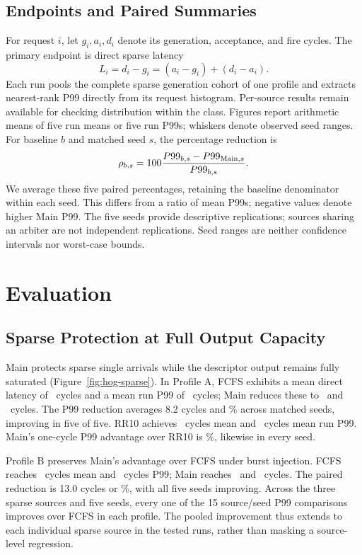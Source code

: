 \subsection{Endpoints and Paired Summaries}
For request $i$, let $g_i,a_i,d_i$ denote its generation, acceptance, and fire cycles.
The primary endpoint is direct sparse latency
\begin{equation}
 L_i=d_i-g_i=(a_i-g_i)+(d_i-a_i).
 \label{eq:latency}
\end{equation}
Each run pools the complete sparse generation cohort of one profile and extracts
nearest-rank P99 directly from its request histogram. Per-source results remain
available for checking distribution within the class. Figures report arithmetic
means of five run means or five run P99s; whiskers denote observed seed ranges.
For baseline $b$ and matched seed $s$, the percentage reduction is
\begin{equation}
 \rho_{b,s}=100\frac{P99_{b,s}-P99_{{\rm Main},s}}{P99_{b,s}}.
 \label{eq:paired}
\end{equation}
We average these five paired percentages, retaining the baseline denominator
within each seed. This differs from a ratio of mean P99s; negative values
denote higher Main P99. The five seeds provide descriptive replications;
sources sharing an arbiter are not independent replications. Seed ranges
are neither confidence intervals nor worst-case bounds.

\section{Evaluation}
\subsection{Sparse Protection at Full Output Capacity}
Main protects sparse single arrivals while the descriptor output remains fully
saturated (Figure~\ref{fig:hog-sparse}). In Profile A, FCFS exhibits a mean direct
latency of \HSMeanAFCFS\ cycles and a mean run P99 of \HSPtailAFCFS\ cycles;
Main reduces these to \HSMeanAMain\ and \HSPtailAMain\ cycles.
The P99 reduction averages 8.2 cycles and \HSReductionAFCFS\% across matched
seeds, improving in five of five. RR10 achieves \HSMeanARR\ cycles mean and
\HSPtailARR\ cycles mean run P99. Main's one-cycle P99 advantage over RR10
is \HSReductionARR\%, likewise in every seed.



Profile B preserves Main's advantage over FCFS under burst injection. FCFS
reaches \HSMeanBFCFS\ cycles mean and \HSPtailBFCFS\ cycles P99; Main reaches
\HSMeanBMain\ and \HSPtailBMain\ cycles. The paired reduction is 13.0 cycles
or \HSReductionBFCFS\%, with all five seeds improving. Across the three sparse
sources and five seeds, every one of the 15 source/seed P99 comparisons improves
over FCFS in each profile. The pooled improvement thus extends to each individual sparse
source in the tested runs, rather than masking a source-level regression.

